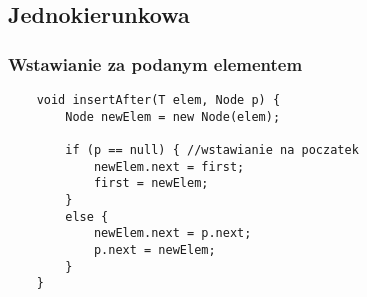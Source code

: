 \documentclass[../algorytmy.tex]{subfiles}
\begin{document}
    \subsection{Jednokierunkowa}









    \subsubsection{Wstawianie za podanym elementem}
    \begin{verbatim}
    void insertAfter(T elem, Node p) {
        Node newElem = new Node(elem);

        if (p == null) { //wstawianie na poczatek
            newElem.next = first;
            first = newElem;
        }
        else {
            newElem.next = p.next;
            p.next = newElem;
        }
    }
    \end{verbatim}
\end{document}
